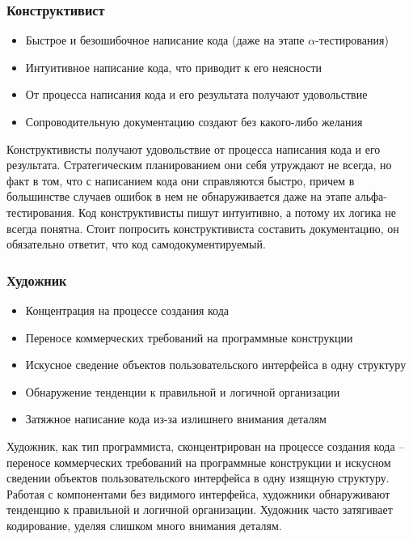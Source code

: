 \documentclass{../industrial-development}
\begin{document}
{\begin{frame} \frametitle{Конструктивист}
	 \begin{itemize}
                     \item Быстрое и безошибочное написание кода (даже на этапе $\alpha$-тестирования)
 		\item Интуитивное написание кода, что приводит к его неясности
		\item От процесса написания кода и его результата получают удовольствие
 		\item Сопроводительную документацию создают без какого-либо желания
		\end{itemize}
\end{frame}
\lecturenotes
Конструктивисты получают удовольствие от процесса написания кода и его результата. Стратегическим планированием они себя утруждают не всегда, но факт в том, что с написанием кода они справляются быстро, причем в большинстве случаев ошибок в нем не обнаруживается даже на этапе альфа-тестирования. Код конструктивисты пишут интуитивно, а потому их логика не всегда понятна.
Стоит попросить конструктивиста составить документацию, он обязательно ответит, что код самодокументируемый.

\begin{frame} \frametitle{Художник}
	 \begin{itemize}
                     \item Концентрация на процессе создания кода
		\item Переносе коммерческих требований на программные конструкции
 		\item Искусное сведение объектов пользовательского интерфейса в одну структуру
 		\item Обнаружение тенденции к правильной и логичной организации
		\item Затяжное написание кода из-за излишнего внимания деталям
		\end{itemize}
\end{frame}
\lecturenotes
Художник, как тип программиста, сконцентрирован на процессе создания кода – переносе коммерческих требований на программные конструкции и искусном сведении объектов пользовательского интерфейса в одну изящную структуру. Работая с компонентами без видимого интерфейса, художники обнаруживают тенденцию к правильной и логичной организации. 
Художник часто затягивает кодирование, уделяя слишком много внимания деталям.

}
\end{document}
